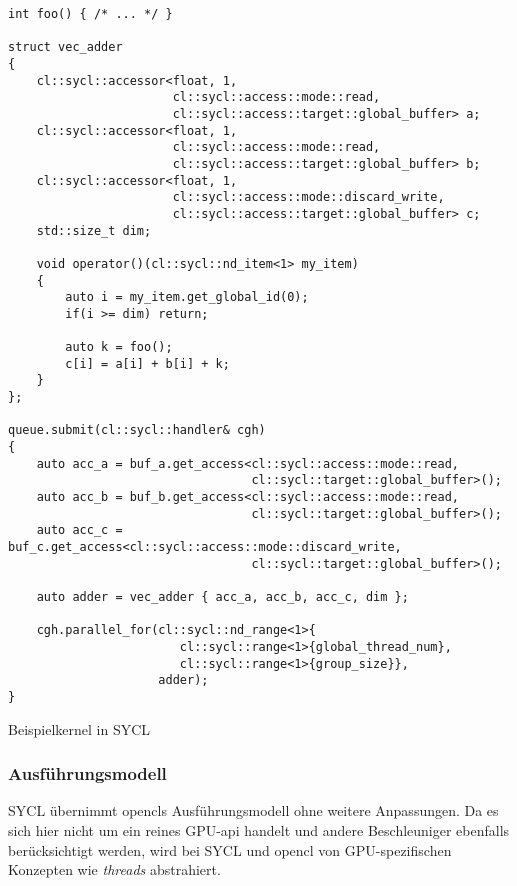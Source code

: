 \begin{code}
    \begin{verbatim}
int foo() { /* ... */ }

struct vec_adder
{
    cl::sycl::accessor<float, 1,
                       cl::sycl::access::mode::read,
                       cl::sycl::access::target::global_buffer> a;
    cl::sycl::accessor<float, 1,
                       cl::sycl::access::mode::read,
                       cl::sycl::access::target::global_buffer> b;
    cl::sycl::accessor<float, 1,
                       cl::sycl::access::mode::discard_write,
                       cl::sycl::access::target::global_buffer> c;
    std::size_t dim;

    void operator()(cl::sycl::nd_item<1> my_item)
    {
        auto i = my_item.get_global_id(0);
        if(i >= dim) return;

        auto k = foo();
        c[i] = a[i] + b[i] + k;
    }
};

queue.submit(cl::sycl::handler& cgh)
{
    auto acc_a = buf_a.get_access<cl::sycl::access::mode::read,
                                  cl::sycl::target::global_buffer>();
    auto acc_b = buf_b.get_access<cl::sycl::access::mode::read,
                                  cl::sycl::target::global_buffer>();
    auto acc_c = buf_c.get_access<cl::sycl::access::mode::discard_write,
                                  cl::sycl::target::global_buffer>();

    auto adder = vec_adder { acc_a, acc_b, acc_c, dim };

    cgh.parallel_for(cl::sycl::nd_range<1>{
                        cl::sycl::range<1>{global_thread_num},
                        cl::sycl::range<1>{group_size}},
                     adder);
}
    \end{verbatim}
    \caption{Beispielkernel in SYCL}
    \label{vergleich:sycl:einfuehrung:vecadd}
\end{code}

\subsubsection{Ausführungsmodell}

SYCL übernimmt \gls{opencl}s Ausführungsmodell ohne weitere Anpassungen. Da es
sich hier nicht um ein reines GPU-\gls{api} handelt und andere Beschleuniger
ebenfalls berücksichtigt werden, wird bei SYCL und \gls{opencl} von
GPU-spezifischen Konzepten wie \textit{threads} abstrahiert.

